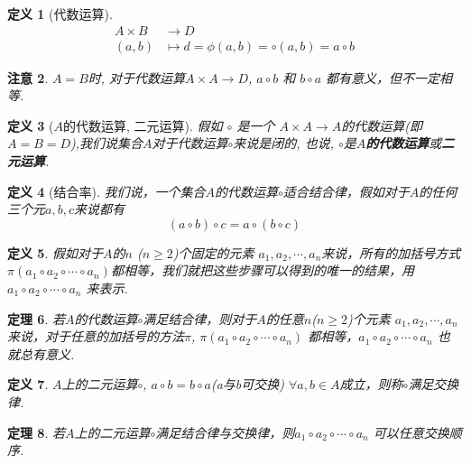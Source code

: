 \documentclass[UTF8]{ctexart}
\newtheorem{Definition}{定义}%
\newtheorem{Theorem}[Definition]{定理}
\newtheorem{Remark}[Definition]{注意}
\begin{document}
\begin{Definition}[代数运算] 
$$\begin{aligned}
A \times B &\rightarrow D \\ 
(a, b) &\mapsto d = \phi(a, b) = \circ (a, b) = a \circ b \end{aligned}$$
\end{Definition}

\begin{Remark}
 $A = B$时, 对于代数运算$ A \times A \rightarrow D $, $ a \circ b $ 和 $ b \circ a $ 都有意义，但不一定相等.
\end{Remark}

\begin{Definition}[$A$的代数运算, 二元运算] 
假如 $ \circ $ 是一个 $ A \times A \rightarrow A$的代数运算(即$A = B = D$),我们说集合$A$对于代数运算$\circ$来说是闭的, 也说, $\circ$是\textbf{$A$的代数运算}或\textbf{二元运算}.
\end{Definition}

\begin{Definition}[结合率]
我们说，一个集合$A$的代数运算$\circ$适合结合律，假如对于$A$的任何三个元$a, b, c$来说都有$$
(a \circ b) \circ c = a \circ (b \circ c)
$$
\end{Definition}

\begin{Definition}
假如对于$A$的$n$ ($n \ge 2$)个固定的元素 $a_1, a_2, \cdots, a_n$来说，所有的加括号方式 $\pi(a_1 \circ a_2 \circ \cdots \circ a_n)$都相等，我们就把这些步骤可以得到的唯一的结果，用$a_1 \circ a_2 \circ \cdots \circ a_n $ 来表示.
\end{Definition}

\begin{Theorem}
若$A$的代数运算$\circ$满足结合律，则对于$A$的任意$n$($n \ge 2$)个元素 $a_1, a_2, \cdots, a_n$来说，对于任意的加括号的方法$\pi$, $\pi(a_1 \circ a_2 \circ \cdots \circ a_n)$ 都相等，$a_1 \circ a_2 \circ \cdots \circ a_n$ 也就总有意义.
\end{Theorem}

\begin{Definition}
$A$上的二元运算$\circ$, $a \circ b = b \circ a$(a与b可交换) $\forall a, b \in A$成立，则称$\circ$满足交换律. 
\end{Definition}

\begin{Theorem}
若$A$上的二元运算$\circ$满足结合律与交换律，则$a_1 \circ a_2 \circ \cdots \circ a_n$ 可以任意交换顺序.
\end{Theorem}
\end{document}
